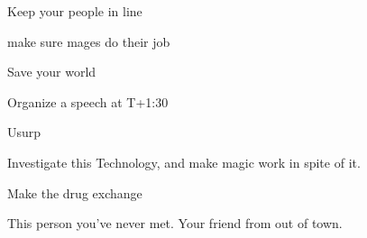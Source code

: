 \documentclass[char]{guildcamp3}
\begin{document}
\begin{itemz}[Goals]
  \item Keep your people in line
  \item make sure mages do their job
  \item Save your world
  \item Organize a speech at T+1:30
  \item Usurp \cNobleOne{}
  \item Investigate this Technology, and make magic work in spite of it.
  \item Make the drug exchange
\end{itemz}

\begin{contacts}
  \contact{\cNPC{}} This person you've never met.
  \contact{\cSomeGuy{}} Your friend from out of town.
\end{contacts}
\end{document}
